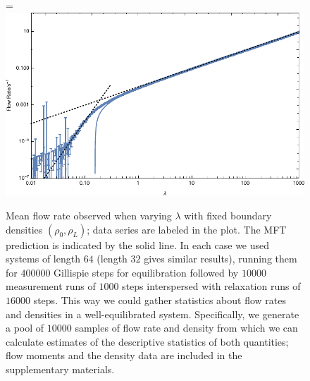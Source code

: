 \documentclass[
reprint,
 amsmath,amssymb,
 aps,
 prl,
]{revtex4-1}
\begin{document}
\begin{figure}[h!]
\vspace{1em}
\caption{\label{fig:lambdaScans} Mean flow rate observed when varying $\lambda$ with fixed boundary densities $(\rho_0, \rho_L)$; data series are labeled in the plot.
The MFT prediction is indicated by the solid line.
In each case we used systems of length $64$ (length $32$ gives similar results),
running them for $400000$ Gillispie steps for equilibration followed by $10000$ measurement runs of $1000$ steps interspersed with relaxation runs of $16000$
steps. This way we could gather statistics about flow rates and densities in a well-equilibrated system. Specifically, we generate a pool of $10000$ samples of flow rate and density
from which we can calculate estimates of the descriptive statistics of both quantities; flow moments and the density data are included in the supplementary materials.
\vspace{1em}}
=\hbox{\includegraphics[width=\linewidth]{logFlowRates}}

\end{figure}
\end{document}
